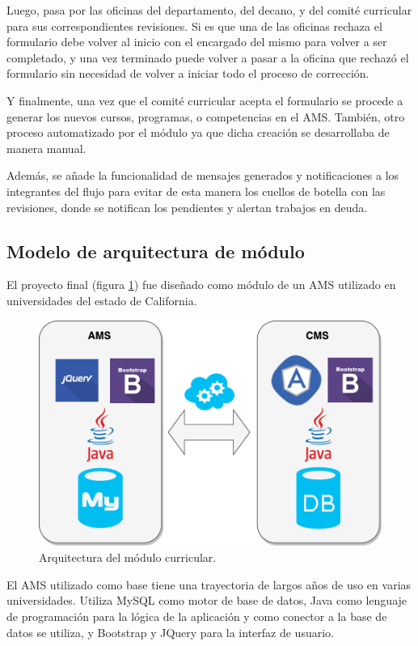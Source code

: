 Luego, pasa por las oficinas del departamento, del decano, y del comité curricular para sus correspondientes revisiones. Si es que una de las oficinas rechaza el formulario debe volver al inicio con el encargado del mismo para volver a ser completado, y una vez terminado puede volver a pasar a la oficina que rechazó el formulario sin necesidad de volver a iniciar todo el proceso de corrección.

Y finalmente, una vez que el comité curricular acepta el formulario se procede a generar los nuevos cursos, programas, o competencias en el AMS. También, otro proceso automatizado por el módulo ya que dicha creación se desarrollaba de manera manual.

Además, se añade la funcionalidad de mensajes generados y notificaciones a los integrantes del flujo para evitar de esta manera los cuellos de botella con las revisiones, donde se notifican los pendientes y alertan trabajos en deuda.

\subsection{Modelo de arquitectura de módulo}

El proyecto final (figura \ref{arquitectura}) fue diseñado como módulo de un AMS utilizado en universidades del estado de California.

\begin{figure}[]
\centering
\includegraphics[scale=0.4]{img/arquitectura}
\caption{Arquitectura del módulo curricular.}
  \label{arquitectura}
\end{figure}

El AMS utilizado como base tiene una trayectoria de largos años de uso en varias universidades. Utiliza MySQL como motor de base de datos, Java como lenguaje de programación para la lógica de la aplicación y como conector a la base de datos se utiliza, y Bootstrap y JQuery para la interfaz de usuario. 

